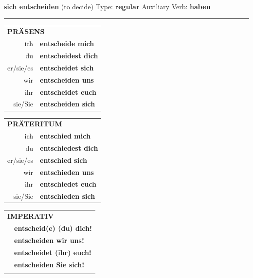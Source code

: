 \documentclass[10pt,a4paper]{revtex4-2}
\begin{document}
\begin{verbbox}
        {\Large \bf sich entscheiden} (to decide) \hfill Type: \textbf{regular} \hfill Auxiliary Verb: \textbf{haben} 
    
       \vspace{5pt}

    \hrule
    
    \vspace{5pt}

  \begin{tabular}{rl}
     \multicolumn{2}{l}{\textbf{PRÄSENS} }\\
    ich & \textbf{entscheide mich}\\
    du & \textbf{entscheidest dich}\\
    er/sie/es & \textbf{entscheidet sich}\\
    wir & \textbf{entscheiden uns}\\
    ihr & \textbf{entscheidet euch}\\
    sie/Sie & \textbf{entscheiden sich}\\
  \end{tabular}
  \hfill
     \begin{tabular}{rl}
    \multicolumn{2}{l}{\textbf{PRÄTERITUM} }\\
    ich & \textbf{entschied mich}\\
    du & \textbf{entschiedest dich}\\
    er/sie/es & \textbf{entschied sich}\\
    wir & \textbf{entschieden uns}\\
    ihr & \textbf{entschiedet euch}\\
    sie/Sie & \textbf{entschieden sich}\\
  \end{tabular}
  \hfill
  \begin{tabular}{rl}
     \multicolumn{2}{l}{\textbf{IMPERATIV} }\\
   & \textbf{entscheid(e) (du) dich!}\\
   & \textbf{entscheiden wir uns!}\\
   & \textbf{entscheidet (ihr) euch!}\\
   & \textbf{entscheiden Sie sich!}\\
   & \vspace{10pt}
  \end{tabular}

    \vspace{10pt}


\end{verbbox}
\end{document}
